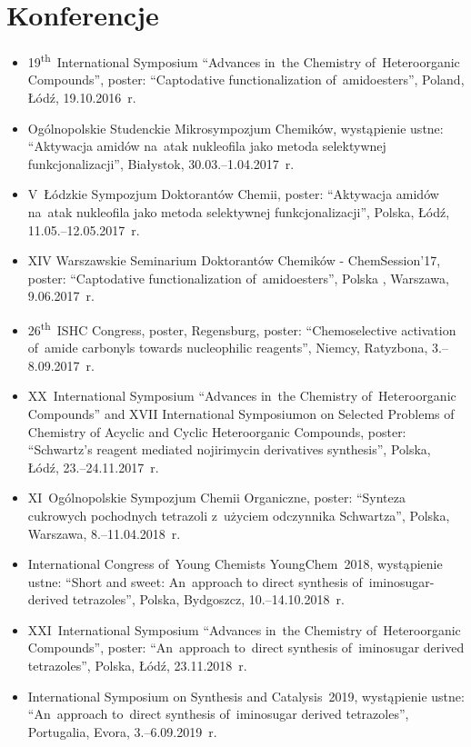 \section{Konferencje}\label{intro:conferences}
\begin{fullwidth}
\begin{itemize}
  \item 19\textsuperscript{th}~International Symposium \enquote{Advances in~the Chemistry of~Heteroorganic Compounds}, poster: \enquote{Captodative functionalization of~amidoesters}, Poland, Łódź, 19.10.2016~r.
  \item Ogólnopolskie Studenckie Mikrosympozjum Chemików, wystąpienie ustne: \enquote{Aktywacja amidów na~atak nukleofila jako metoda selektywnej funkcjonalizacji}, Białystok, 30.03.\-–1.04.2017~r.
  \item V~Łódzkie Sympozjum Doktorantów Chemii, poster: \enquote{Aktywacja amidów na~atak nukleofila jako metoda selektywnej funkcjonalizacji}, Polska, Łódź, 11.05.\-–12.05.2017~r.
  \item XIV Warszawskie Seminarium Doktorantów Chemików - ChemSession’17, poster: \enquote{Captodative functionalization of~amidoesters}, Polska , Warszawa, 9.06.2017~r.
  \item 26\textsuperscript{th}~ISHC Congress, poster, Regensburg, poster: \enquote{Chemoselective activation of~amide carbonyls towards nucleophilic reagents}, Niemcy, Ratyzbona, 3.\-–8.09.2017~r.
  \item XX~International Symposium \enquote{Advances in~the Chemistry of~Heteroorganic Compounds} and XVII International Symposiumon on Selected Problems of Chemistry of Acyclic and Cyclic Heteroorganic Compounds, poster: \enquote{Schwartz’s reagent mediated nojirimycin derivatives synthesis}, Polska, Łódź, 23.\-–24.11.2017~r.
  \item XI~Ogólnopolskie Sympozjum Chemii Organiczne, poster: \enquote{Synteza cukrowych pochodnych tetrazoli z~użyciem odczynnika Schwartza}, Polska, Warszawa, 8.\-–11.04.2018~r.
  \item International Congress of~Young Chemists YoungChem~2018, wystąpienie ustne: \enquote{Short and sweet: An~approach to direct synthesis of~iminosugar-derived tetrazoles}, Polska, Bydgoszcz, 10.\-–14.10.2018~r.
  \item XXI~International Symposium \enquote{Advances in~the Chemistry of~Heteroorganic Compounds}, poster: \enquote{An~approach to~direct synthesis of~iminosugar derived tetrazoles}, Polska, Łódź, 23.11.2018~r.
  \item International Symposium on Synthesis and Catalysis~2019, wystąpienie ustne: \enquote{An~approach to~direct synthesis of~iminosugar derived tetrazoles}, Portugalia, Evora, 3.\-–6.09.2019~r.

\end{itemize}
\end{fullwidth}

